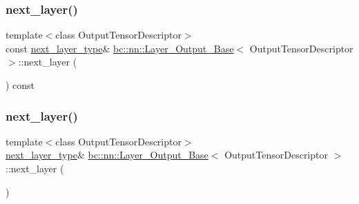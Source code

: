 \subsubsection{\texorpdfstring{next\+\_\+layer()}{next\_layer()}\hspace{0.1cm}{\footnotesize\ttfamily [3/4]}}
{\footnotesize\ttfamily template$<$class Output\+Tensor\+Descriptor$>$ \\
const \hyperlink{structbc_1_1nn_1_1Layer__Output__Base_a0c791bc57bcc78e8d82e8a5375f1c584}{next\+\_\+layer\+\_\+type}\& \hyperlink{structbc_1_1nn_1_1Layer__Output__Base}{bc\+::nn\+::\+Layer\+\_\+\+Output\+\_\+\+Base}$<$ Output\+Tensor\+Descriptor $>$\+::next\+\_\+layer (\begin{DoxyParamCaption}{ }\end{DoxyParamCaption}) const\hspace{0.3cm}{\ttfamily [inline]}}

\mbox{\label{structbc_1_1nn_1_1Layer__Output__Base_a38b80aba3c1821fbef1f5525e282c36d}} 
\subsubsection{\texorpdfstring{next\+\_\+layer()}{next\_layer()}\hspace{0.1cm}{\footnotesize\ttfamily [4/4]}}
{\footnotesize\ttfamily template$<$class Output\+Tensor\+Descriptor$>$ \\
\hyperlink{structbc_1_1nn_1_1Layer__Output__Base_a0c791bc57bcc78e8d82e8a5375f1c584}{next\+\_\+layer\+\_\+type}\& \hyperlink{structbc_1_1nn_1_1Layer__Output__Base}{bc\+::nn\+::\+Layer\+\_\+\+Output\+\_\+\+Base}$<$ Output\+Tensor\+Descriptor $>$\+::next\+\_\+layer (\begin{DoxyParamCaption}{ }\end{DoxyParamCaption})\hspace{0.3cm}{\ttfamily [inline]}}

\mbox{\label{structbc_1_1nn_1_1Layer__Output__Base_a68e2547ad75da9ef3a3410a9aec85a5e}} 
